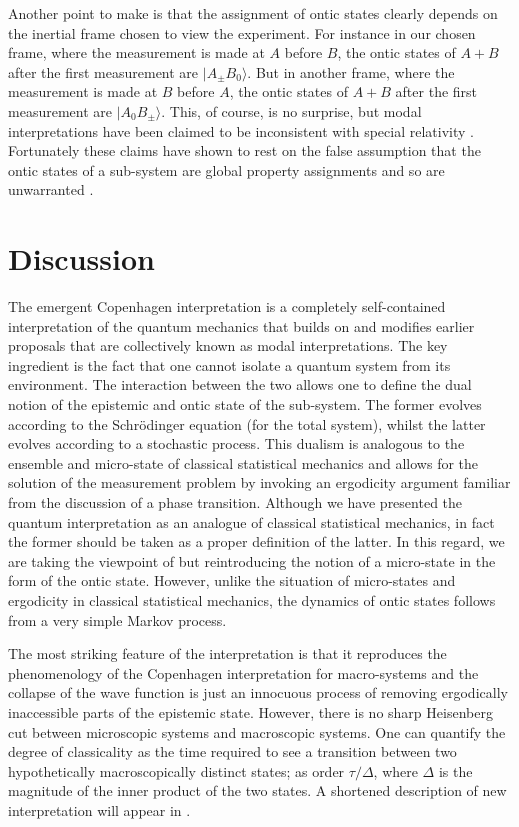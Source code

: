 \documentclass[%
preprint,
nofootinbib,
 amsmath,amssymb,
aps,
]{revtex4-1}
\def\ket#1{| #1\rangle}
\begin{document}
Another point to make is that the assignment of ontic states clearly depends on the inertial frame chosen to view the experiment. For instance in our chosen frame, where the measurement is made at $A$ before $B$, the ontic states of $A+B$ after the first measurement are $\ket{A_\pm B_0}$. But in another frame, where the measurement is made at $B$ before $A$, the ontic states of $A+B$ after the first measurement are $\ket{A_0B_\pm}$. This, of course, is no surprise, but modal interpretations have been claimed to be inconsistent with special relativity \cite{myr}. Fortunately these claims have shown to rest on the false assumption that the ontic states of a sub-system are global property assignments and so are unwarranted \cite{BH}.
 
\section{Discussion}\label{s5}

The emergent Copenhagen interpretation is a completely self-contained interpretation of the quantum mechanics that builds on and modifies earlier proposals that are collectively known as  modal interpretations. The key ingredient is the fact that one cannot isolate a quantum system from its environment. The interaction between the two allows one to define the dual notion of the epistemic and ontic state of the sub-system. The former evolves according to the Schr\"odinger equation (for the total system), whilst the latter evolves according to a stochastic process. This dualism is analogous to the ensemble and micro-state of classical statistical mechanics and allows for the solution of the measurement problem by invoking an ergodicity argument familiar from the discussion of a phase transition. Although we have presented the quantum interpretation as an analogue of classical statistical mechanics, in fact the former should be taken as a proper definition of the latter. In this regard, we are taking the viewpoint of \cite{PopescuShortWinter:2005fsmeisa,PopescuShortWinter:2006efsm,BL,LL,GoldsteinLebowitzTumulkaZanghi:2006ct,LPSW,Sh,GMM} but reintroducing the notion of a micro-state in the form of the ontic state. However, unlike the situation of micro-states and ergodicity in classical statistical mechanics, the dynamics of ontic states follows from a very simple Markov process.

The most striking feature of the interpretation is that it reproduces the phenomenology of the Copenhagen interpretation for macro-systems and the collapse of the wave function is just an innocuous process of removing ergodically inaccessible parts of the epistemic state. However, there is no sharp Heisenberg cut between microscopic systems and macroscopic systems. One can quantify the degree of classicality as the time required to see a transition between two hypothetically macroscopically distinct states; as order $\tau/\Delta$, where $\Delta$ is the magnitude of the inner product of the two states.
A shortened description of new interpretation  will appear in \cite{lett}.
\end{document}
